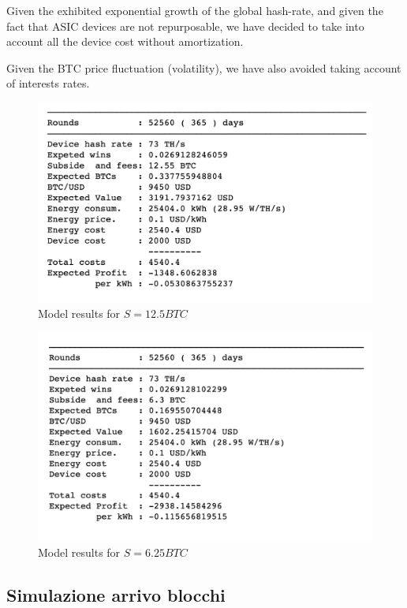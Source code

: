 \documentclass{book}
\theoremstyle{definition}
\begin{document}
Given the exhibited exponential growth of the global hash-rate, and given the fact that ASIC devices are not repurposable, we have decided to take into account all the device cost without amortization.

Given the BTC price fluctuation (volatility), we have also avoided taking account of interests rates.

\begin{figure}[ht]
    \centering
    \includegraphics[scale=0.50]{img/results-12.png}
    \caption{Model results for $S = 12.5 BTC$}
    \label{fig:results-12}
\end{figure}

\begin{figure}[ht]
    \centering
    \includegraphics[scale=0.50]{img/results.png}
    \caption{Model results for $S = 6.25 BTC$}
    \label{fig:results}
\end{figure}

\clearpage

\subsection{Simulazione arrivo blocchi}
\end{document}

